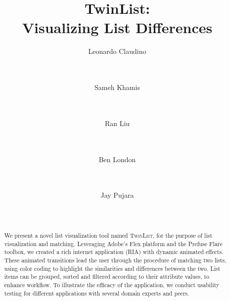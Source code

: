 \documentclass{chi2009}
\newcommand{\TwinList}{\textsc{TwinList}}
\begin{document}
\setlength{\paperheight}{11in}
\setlength{\paperwidth}{8.5in}
\setlength{\pdfpageheight}{\paperheight}
\setlength{\pdfpagewidth}{\paperwidth}


\title{TwinList: \\ Visualizing List Differences}
\author{
  \alignauthor Leonardo Claudino \\
    \\
    \\
  \and
  \alignauthor Sameh Khamis\\
    \\
    \\
  \and
  \alignauthor Ran Liu \\
    \\
    \\
  \and
  \alignauthor Ben London \\
    \\
    \\
  \and
  \alignauthor Jay Pujara \\
    \\
    \\
}

\maketitle

\begin{abstract}
We present a novel list visualization tool named \TwinList, for the purpose of list visualization and matching. Leveraging Adobe's Flex platform and the Prefuse Flare toolbox, we created a rich internet application (RIA) with dynamic animated effects. These animated transitions lead the user through the procedure of matching two lists, using color coding to highlight the similarities and differences between the two. List items can be grouped, sorted and filtered according to their attribute values, to enhance workflow. To illustrate the efficacy of the application, we conduct usability testing for different applications with several domain experts and peers.
\end{abstract}
\end{document}
